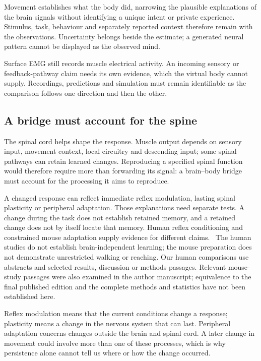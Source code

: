 Movement establishes what the body did, narrowing the plausible explanations
of the brain signals without identifying a unique intent or private experience.
Stimulus, task, behaviour and separately reported context therefore remain with
the observations. Uncertainty belongs beside the estimate; a generated neural
pattern cannot be displayed as the observed mind.

Surface EMG still records muscle electrical activity. An incoming sensory or
feedback-pathway claim needs its own evidence, which the virtual body cannot
supply. Recordings, predictions and simulation must remain identifiable as the
comparison follows one direction and then the other.

\subsection{A bridge must account for the spine}

The spinal cord helps shape the response. Muscle output depends on sensory
input, movement context, local circuitry and descending input; some spinal
pathways can retain learned changes. Reproducing a specified spinal function
would therefore require more than forwarding its signal: a brain--body bridge
must account for the processing it aims to reproduce.

A changed response can reflect immediate reflex modulation, lasting spinal
plasticity or peripheral adaptation. Those explanations need separate tests.
A change during the task does not establish retained memory, and a retained
change does not by itself locate that memory. Human reflex conditioning and
constrained mouse adaptation supply evidence for different claims.~\cite{thompson2009retained,thompson2013retained,lavaud2024}
The human studies do not establish brain-independent learning; the mouse
preparation does not demonstrate unrestricted walking or reaching. Our human
comparisons use abstracts and selected results, discussion or methods passages.
Relevant mouse-study passages were also examined in the author manuscript;
equivalence to the final published edition and the complete methods and
statistics have not been established here.

Reflex modulation means that the current conditions change a response;
plasticity means a change in the nervous system that can last. Peripheral
adaptation concerns changes outside the brain and spinal cord. A later
change in movement could involve more than one of these processes, which
is why persistence alone cannot tell us where or how the change occurred.

